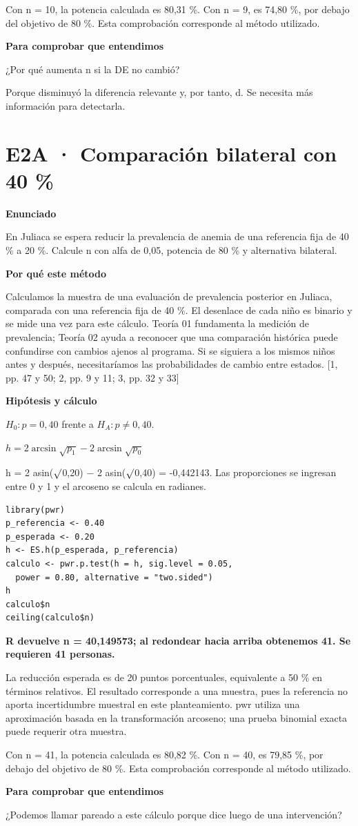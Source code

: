 \documentclass[10pt,a4paper]{article}
\newcommand{\etiqueta}[1]{\par{\bfseries\color{Blue}#1}\par}
\newcommand{\cajares}[1]{\par\colorbox{Pale}{\parbox{\dimexpr\linewidth-2\fboxsep}{\vspace{4pt}\textbf{\color{Navy}#1}\vspace{4pt}}}\par}
\begin{document}
{\small\color{Gray}Con n = 10, la potencia calculada es 80,31 \%. Con n = 9, es 74,80 \%, por debajo del objetivo de 80 \%. Esta comprobación corresponde al método utilizado.}
\etiqueta{Para comprobar que entendimos}
¿Por qué aumenta n si la DE no cambió?

{\small Porque disminuyó la diferencia relevante y, por tanto, d. Se necesita más información para detectarla.}
\clearpage
\section*{E2A · Comparación bilateral con 40 \%}
\etiqueta{Enunciado}
En Juliaca se espera reducir la prevalencia de anemia de una referencia fija de 40 \% a 20 \%. Calcule n con alfa de 0,05, potencia de 80 \% y alternativa bilateral.
\etiqueta{Por qué este método}
Calculamos la muestra de una evaluación de prevalencia posterior en Juliaca, comparada con una referencia fija de 40 \%. El desenlace de cada niño es binario y se mide una vez para este cálculo. Teoría 01 fundamenta la medición de prevalencia; Teoría 02 ayuda a reconocer que una comparación histórica puede confundirse con cambios ajenos al programa. Si se siguiera a los mismos niños antes y después, necesitaríamos las probabilidades de cambio entre estados. [1, pp. 47 y 50; 2, pp. 9 y 11; 3, pp. 32 y 33]
\etiqueta{Hipótesis y cálculo}
$H_0:p=0{,}40$ frente a $H_A:p\ne0{,}40$.

$h=2\arcsin\sqrt{p_1}-2\arcsin\sqrt{p_0}$

h = 2 asin(\ensuremath{\surd}0,20) \ensuremath{-} 2 asin(\ensuremath{\surd}0,40) = -0,442143. Las proporciones se ingresan entre 0 y 1 y el arcoseno se calcula en radianes.
\begin{Verbatim}
library(pwr)
p_referencia <- 0.40
p_esperada <- 0.20
h <- ES.h(p_esperada, p_referencia)
calculo <- pwr.p.test(h = h, sig.level = 0.05,
  power = 0.80, alternative = "two.sided")
h
calculo$n
ceiling(calculo$n)
\end{Verbatim}
\cajares{R devuelve n = 40,149573; al redondear hacia arriba obtenemos 41. Se requieren 41 personas.}
La reducción esperada es de 20 puntos porcentuales, equivalente a 50 \% en términos relativos. El resultado corresponde a una muestra, pues la referencia no aporta incertidumbre muestral en este planteamiento. pwr utiliza una aproximación basada en la transformación arcoseno; una prueba binomial exacta puede requerir otra muestra.

{\small\color{Gray}Con n = 41, la potencia calculada es 80,82 \%. Con n = 40, es 79,85 \%, por debajo del objetivo de 80 \%. Esta comprobación corresponde al método utilizado.}
\etiqueta{Para comprobar que entendimos}
¿Podemos llamar pareado a este cálculo porque dice luego de una intervención?
\end{document}
